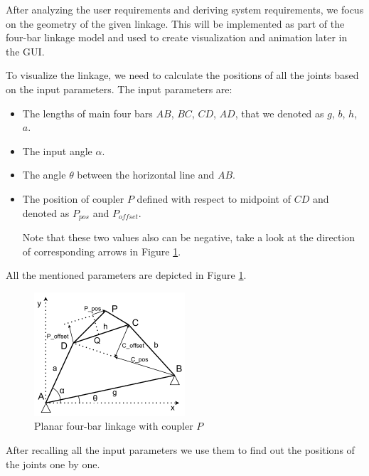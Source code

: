 \documentclass{article}
\begin{document}
After analyzing the user requirements and deriving system requirements, we focus on the geometry of the given linkage. This will be implemented as part of the four-bar linkage model and used to create visualization and animation later in the GUI.

To visualize the linkage, we need to calculate the positions of all the joints based on the input parameters. The input parameters are:
\begin{itemize}
 \item The lengths of main four bars $AB$, $BC$, $CD$, $AD$, that we denoted as $g$, $b$, $h$, $a$.
 \item The input angle $\alpha$.
 \item The angle $\theta$ between the horizontal line and $AB$.
 \item The position of coupler $P$ defined with respect to midpoint of $CD$ and denoted as $P_{pos}$ and $P_{offset}$. 
 
 Note that these two values also can be negative, take a look at the direction of corresponding arrows in Figure \ref{fig:four-bar_linakge_analysis}.
\end{itemize}

All the mentioned parameters are depicted in Figure \ref{fig:four-bar_linakge_analysis}.

\begin{figure}[h]
	\begin{center}
		\includegraphics[width=0.5\textwidth]{./figures/four-bar_linkage+coupler_analysis.pdf}
	\end{center}
	\caption{Planar four-bar linkage with coupler $P$}
	\label{fig:four-bar_linakge_analysis}
\end{figure}
 
 After recalling all the input parameters we use them to find out the positions of the joints one by one.
 
\end{document}
